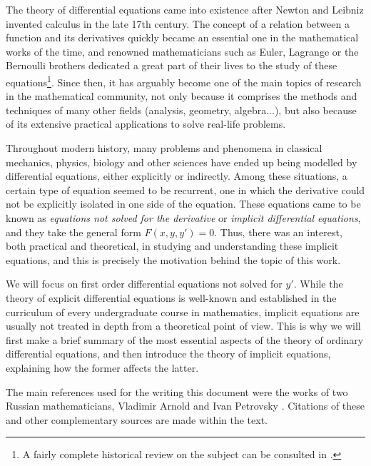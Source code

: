 %
%
%

The theory of differential equations came into existence after Newton and Leibniz invented calculus in the late 17th century. The concept of a relation between a function and its derivatives quickly became an essential one in the mathematical works of the time, and renowned mathematicians such as Euler, Lagrange or the Bernoulli brothers dedicated a great part of their lives to the study of these equations\footnote{A fairly complete historical review on the subject can be consulted in \cite{archibald2004history}.}. Since then, it has arguably become one of the main topics of research in the mathematical community, not only because it comprises the methods and techniques of many other fields (analysis, geometry, algebra...), but also because of its extensive practical applications to solve real-life problems.

Throughout modern history, many problems and phenomena in classical mechanics, physics, biology and other sciences have ended up being modelled by differential equations, either explicitly or indirectly. Among these situations, a certain type of equation seemed to be recurrent, one in which the derivative could not be explicitly isolated in one side of the equation. These equations came to be known as \textit{equations not solved for the derivative} or \textit{implicit differential equations}, and they take the general form $F(x,y,y')=0$. Thus, there was an interest, both practical and theoretical, in studying and understanding these implicit equations, and this is precisely the motivation behind the topic of this work.

We will focus on first order differential equations not solved for $y'$. While the theory of explicit differential equations is well-known and established in the curriculum of every undergraduate course in mathematics, implicit equations are usually not treated in depth from a theoretical point of view. This is why we will first make a brief summary of the most essential aspects of the theory of ordinary differential equations, and then introduce the theory of implicit equations, explaining how the former affects the latter.

The main references used for the writing this document were the works of two Russian mathematicians, Vladimir Arnold \cite{arnold2012geometrical, cooke1992ordinary} and Ivan Petrovsky \cite{petrovski1966ordinary}. Citations of these and other complementary sources are made within the text.

